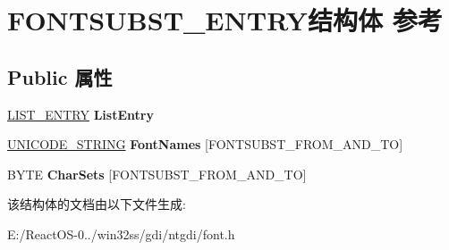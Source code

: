 \hypertarget{struct_f_o_n_t_s_u_b_s_t___e_n_t_r_y}{}\section{F\+O\+N\+T\+S\+U\+B\+S\+T\+\_\+\+E\+N\+T\+R\+Y结构体 参考}
\label{struct_f_o_n_t_s_u_b_s_t___e_n_t_r_y}
\subsection*{Public 属性}
\begin{DoxyCompactItemize}
\item 
\mbox{\label{struct_f_o_n_t_s_u_b_s_t___e_n_t_r_y_af2f001a2a77f117698d3869c7f0cfa12}} 
\hyperlink{struct___l_i_s_t___e_n_t_r_y}{L\+I\+S\+T\+\_\+\+E\+N\+T\+RY} {\bfseries List\+Entry}
\item 
\mbox{\label{struct_f_o_n_t_s_u_b_s_t___e_n_t_r_y_a2f636b1127f23ce2c1bba5e6461e005e}} 
\hyperlink{struct___u_n_i_c_o_d_e___s_t_r_i_n_g}{U\+N\+I\+C\+O\+D\+E\+\_\+\+S\+T\+R\+I\+NG} {\bfseries Font\+Names} \mbox{[}F\+O\+N\+T\+S\+U\+B\+S\+T\+\_\+\+F\+R\+O\+M\+\_\+\+A\+N\+D\+\_\+\+TO\mbox{]}
\item 
\mbox{\label{struct_f_o_n_t_s_u_b_s_t___e_n_t_r_y_a579d2e418e43858a0443e049b74bf615}} 
B\+Y\+TE {\bfseries Char\+Sets} \mbox{[}F\+O\+N\+T\+S\+U\+B\+S\+T\+\_\+\+F\+R\+O\+M\+\_\+\+A\+N\+D\+\_\+\+TO\mbox{]}
\end{DoxyCompactItemize}


该结构体的文档由以下文件生成\+:\begin{DoxyCompactItemize}
\item 
E\+:/\+React\+O\+S-\/0../win32ss/gdi/ntgdi/font.\+h\end{DoxyCompactItemize}
